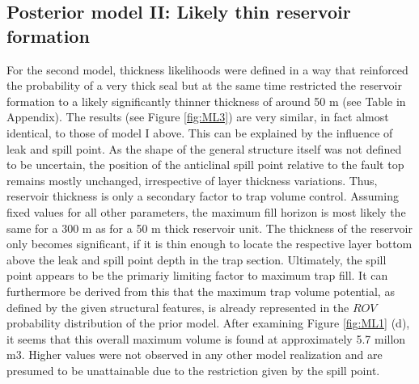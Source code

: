 		\subsection{Posterior model II: Likely thin reservoir formation}%
		For the second model, thickness likelihoods were defined in a way that reinforced the probability of a very thick seal but at the same time restricted the reservoir formation to a likely significantly thinner thickness of around 50 m (see Table in Appendix). The results (see Figure \ref{fig:ML3}) are very similar, in fact almost identical, to those of model I above. This can be explained by the influence of leak and spill point. As the shape of the general structure itself was not defined to be uncertain, the position of the anticlinal spill point relative to the fault top remains mostly unchanged, irrespective of layer thickness variations. Thus, reservoir thickness is only a secondary factor to trap volume control. Assuming fixed values for all other parameters, the maximum fill horizon is most likely the same for a 300 m as for a 50 m thick reservoir unit. The thickness of the reservoir only becomes significant, if it is thin enough to locate the respective layer bottom above the leak and spill point depth in the trap section. Ultimately, the spill point appears to be the primariy limiting factor to maximum trap fill. It can furthermore be derived from this that the maximum trap volume potential, as defined by the given structural features, is already represented in the $ROV$ probability distribution of the prior model. After examining Figure \ref{fig:ML1} (d), it seems that this overall maximum volume is found at approximately 5.7 millon m$3$. Higher values were not observed in any other model realization and are presumed to be unattainable due to the restriction given by the spill point.
	

